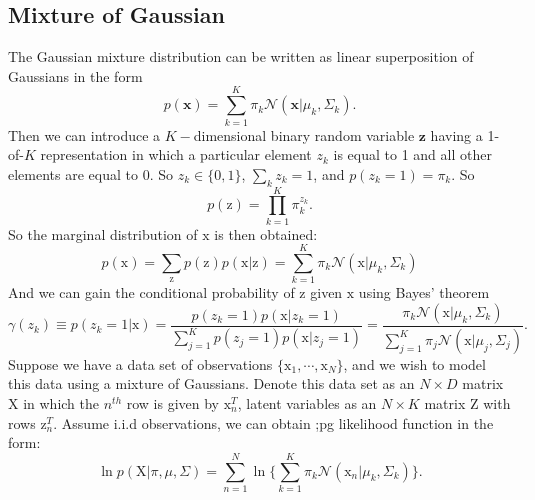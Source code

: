 \documentclass{article}
\newcommand{\normD}{\mathcal{N}}
\newcommand{\mrm}{\mathrm}
\newcommand{\mbf}{\mathbf}
\begin{document}
\subsection{Mixture of Gaussian}
The Gaussian mixture distribution can be written as linear superposition of Gaussians  in the form
\begin{equation}\label{}
  p(\mbf x) = \sum_{k=1}^{K}\pi_k\normD(\mbf x|\mu_k,\Sigma_k).
\end{equation}
Then we can introduce a $K-$dimensional binary random variable $\mbf z$ having a 1-of-$K$ representation in which a particular element $z_k$ is equal to 1 and all other elements are equal to 0. So $z_k \in \{0,1\}$, $\sum_{k}z_k=1$, and $p(z_k=1)=\pi_k$. So
\begin{equation}\label{}
  p(\mrm z) = \prod_{k=1}^{K}\pi_k^{z_k}.
\end{equation}
So the marginal distribution of $\mrm x$ is then obtained:
\begin{equation}\label{}
  p(\mrm x) = \sum_{\mrm z}p(\mrm z)p(\mrm x|\mrm z) = \sum_{k=1}^{K}\pi_k\normD(\mrm x|\mu_k,\Sigma_k)
\end{equation}
And we can gain the conditional probability of $\mrm z$ given $\mrm x$ using Bayes' theorem
\begin{equation}\label{eq3.3.0}
  \gamma(z_k) \equiv p(z_k=1|\mrm x)=\frac{p(z_k=1)p(\mrm x|z_k=1)}{\sum_{j=1}^{K}p(z_j=1)p(\mrm x|z_j=1)} =  \frac{\pi_k\normD(\mrm x|\mu_k, \Sigma_k)}{\sum_{j=1}^{K}\pi_j\normD(\mrm x|\mu_j,\Sigma_j)}.
\end{equation}
Suppose we have a data set of observations $\{\mrm x_1, \cdots, \mrm x_N\}$, and we wish to model this data using a mixture of Gaussians. Denote this data set as an $N\times D$ matrix $\mrm X$ in which the $n^{th}$ row is given by $\mrm x_n^T$, latent variables as an $N\times K$ matrix $\mrm Z$ with rows $\mrm z_n^T$. Assume i.i.d observations, we can obtain ;pg likelihood function in the form:
\begin{equation}\label{}
  \ln p(\mrm X|\pi, \mu, \Sigma) = \sum_{n=1}^{N}\ln\{\sum_{k=1}^{K}\pi_k\normD(\mrm x_n|\mu_k, \Sigma_k)\}.
\end{equation}
\end{document}
